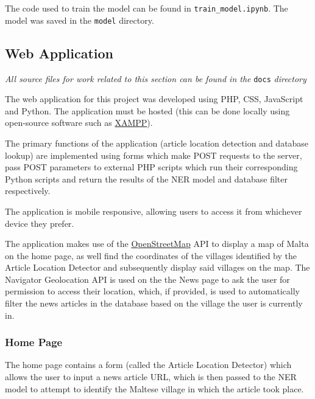 \documentclass[a4paper, oneside, 11pt]{article}
\begin{document}
\begin{multicols*}{2}
  The code used to train the model can be found in \verb|train_model.ipynb|. The model was saved in the \verb|model| directory.


  \subsection{Web Application}
  \textit{All source files for work related to this section can be found in the} \verb|docs| \textit{directory}

  \medskip

  The web application for this project was developed using PHP, CSS, JavaScript and Python. The application must be hosted (this can be done locally using open-source software such as \href{https://www.apachefriends.org/}{XAMPP}).

  The primary functions of the application (article location detection and database lookup) are implemented using forms which make POST requests to the server, pass POST parameters to external PHP scripts which run their corresponding Python scripts and return the results of the NER model and database filter respectively.

  The application is mobile responsive, allowing users to access it from whichever device they prefer.

  The application makes use of the \href{https://www.openstreetmap.org/}{OpenStreetMap} API to display a map of Malta on the home page, as well find the coordinates of the villages identified by the Article Location Detector and subsequently display said villages on the map. The Navigator Geolocation API is used on the the News page to ask the user for permission to access their location, which, if provided, is used to automatically filter the news articles in the database based on the village the user is currently in.

  \subsubsection{Home Page}
  The home page contains a form (called the Article Location Detector) which allows the user to input a news article URL, which is then passed to the NER model to attempt to identify the Maltese village in which the article took place.


\end{multicols*}
\end{document}
